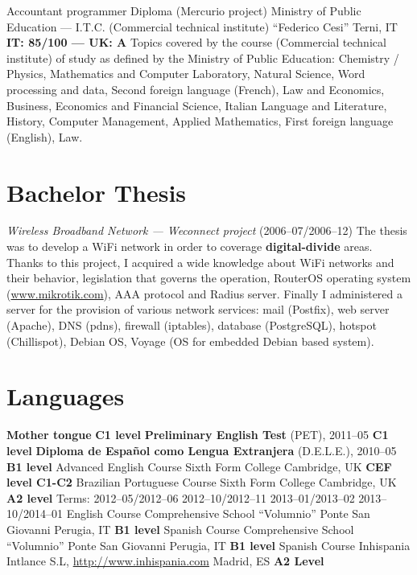 \documentclass[10pt,a4paper,sans]{moderncv}
\begin{document}
    {Accountant programmer Diploma (Mercurio project)}
    {Ministry of Public Education --- I.T.C. (Commercial technical institute)
        ``Federico Cesi''}
    {Terni, IT}
    {\textbf{IT\@: 85/100 --- UK\@: A}}
    {Topics covered by the course (Commercial technical institute) of study as
    defined by the Ministry of Public Education: Chemistry / Physics,
    Mathematics and Computer Laboratory, Natural Science, Word processing and
    data, Second foreign language (French), Law and Economics, Business,
    Economics and Financial Science, Italian Language and Literature, History,
    Computer Management, Applied Mathematics, First foreign language (English),
    Law.}

\section{Bachelor Thesis}
    {\emph{Wireless Broadband Network --- Weconnect project}
        (2006--07/2006--12)}
    {\small The thesis was to develop a WiFi network in order to coverage
    \textbf{digital-divide} areas. Thanks to this project, I acquired a wide
    knowledge about WiFi networks and their behavior, legislation that governs
    the operation, RouterOS operating system (\url{www.mikrotik.com}), AAA
    protocol and Radius server. Finally I administered a server for the
    provision of various network services: mail (Postfix), web server (Apache),
    DNS (pdns), firewall (iptables), database (PostgreSQL), hotspot
    (Chillispot), Debian OS, Voyage (OS for embedded Debian based system).}

\section{Languages}
    {\textbf{Mother tongue}}{}
    {\textbf{C1 level}}
    {\textbf{Preliminary English Test} (PET), 2011--05}
    {\textbf{C1 level}}
    {\textbf{Diploma de Español como Lengua Extranjera} (D.E.L.E.), 2010--05}
    {\textbf{B1 level}}{}
    {Advanced English Course}
    {Sixth Form College}
    {Cambridge, UK}
    {\textbf{CEF level C1-C2}}{}
    {Brazilian Portuguese Course}
    {Sixth Form College}
    {Cambridge, UK}
    {\textbf{A2 level}}
    {Terms: 2012--05/2012--06 2012--10/2012--11 2013--01/2013--02
        2013--10/2014--01}
    {English Course}
    {Comprehensive School ``Volumnio'' Ponte San Giovanni}
    {Perugia, IT}
    {\textbf{B1 level}}{}
    {Spanish Course}
    {Comprehensive School ``Volumnio'' Ponte San Giovanni}
    {Perugia, IT}
    {\textbf{B1 level}}{}
    {Spanish Course}
    {Inhispania Intlance S.L, \url{http://www.inhispania.com}}
    {Madrid, ES}
    {\textbf{A2 Level}}{}
\end{document}
